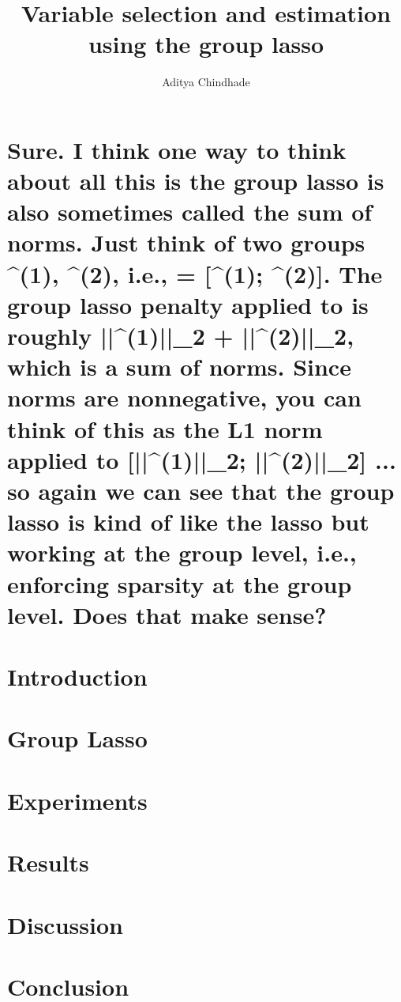 \documentclass[a4paper,12pt]{article}
\title{Variable selection and estimation using the group lasso}
\date{}
\author{Aditya Chindhade}
\begin{document}
	\maketitle

	\newpage
	\tableofcontents
	
	\newpage
	\section{Sure.  I think one way to think about all this is the group lasso is also sometimes called the sum of norms.  Just think of two 	groups \theta^{(1)}, \theta^{(2)}, i.e., \theta = [\theta^{(1)}; \theta^{(2)}].  The group lasso penalty applied to \theta is	 		roughly ||\theta^{(1)}||_2 + ||\theta^{(2)}||_2, which is a sum of norms.  Since norms are nonnegative, you can think of this as the 		L1 norm applied to [||\theta^{(1)}||_2; ||\theta^{(2)}||_2] ... so again we can see that the group lasso is kind of like the lasso 		but 		working at the group level, i.e., enforcing sparsity at the group level.  Does that make sense?}
	
	\newpage
	\section{Introduction}
	\cite{yuan2006model}

	\newpage
	\section{Group Lasso}

	\newpage
	\section{Experiments}

	\newpage
	\section{Results}

	\newpage
	\section{Discussion}

	\newpage
	\section{Conclusion}
	
	\newpage
	
	
\end{document}

